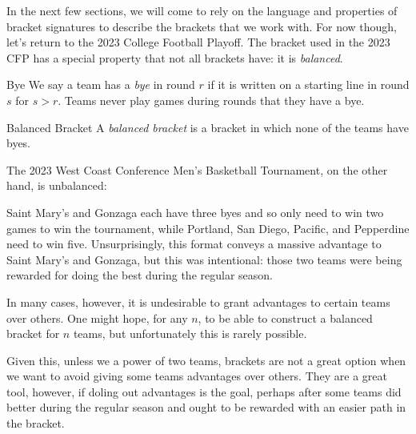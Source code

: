 {In the next few sections, we will come to rely on the language and properties of bracket signatures to describe the brackets that we work with. For now though, let's return to the 2023 College Football Playoff. The bracket used in the 2023 CFP has a special property that not all brackets have: it is \textit{balanced}.

\begin{definition}{Bye}{}
    We say a team has a \textit{bye} in round $r$ if it is written on a starting line in round $s$ for $s > r.$ Teams never play games during rounds that they have a bye.
\end{definition}

\begin{definition}{Balanced Bracket}{}
    A \textit{balanced bracket} is a bracket in which none of the teams have byes.
\end{definition} 

The 2023 West Coast Conference Men's Basketball Tournament, on the other hand, is unbalanced:

Saint Mary's and Gonzaga each have three byes and so only need to win two games to win the tournament, while Portland, San Diego, Pacific, and Pepperdine need to win five. Unsurprisingly, this format conveys a massive advantage to Saint Mary's and Gonzaga, but this was intentional: those two teams were being rewarded for doing the best during the regular season.

In many cases, however, it is undesirable to grant advantages to certain teams over others. One might hope, for any $n$, to be able to construct a balanced bracket for $n$ teams, but unfortunately this is rarely possible.


Given this, unless we a power of two teams, brackets are not a great option when we want to avoid giving some teams advantages over others. They are a great tool, however, if doling out advantages is the goal, perhaps after some teams did better during the regular season and ought to be rewarded with an easier path in the bracket.
}





